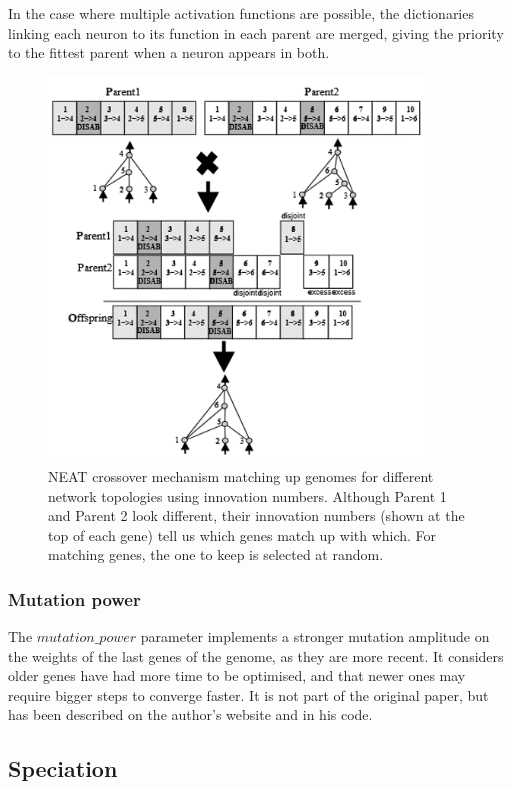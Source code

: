In the case where multiple activation functions are possible, the dictionaries linking each neuron to its function in each parent are merged, giving the priority to the fittest parent when a neuron appears in both. 

\begin{figure}[H]
\centering
\captionsetup{justification=centering,margin=2cm}
\includegraphics[width=10cm]{images/neat_cros.png}
\caption{NEAT crossover mechanism matching  up  genomes  for  different  network  topologies  using  innovation numbers.   Although  Parent 1  and  Parent 2  look  different,  their  innovation  numbers (shown at the top of each gene) tell us which genes match up with which. For matching genes, the one to keep is selected at random. \cite{NEAT_2}}
 \label{NEAT_network}
\end{figure}

\subsubsection{Mutation power}

The $mutation\_power$ parameter implements a stronger mutation amplitude on the weights of the last genes of the genome, as they are more recent. It considers older genes have had more time to be optimised, and that newer ones may require bigger steps to converge faster. It is not part of the original paper, but has been described on the author's website and in his code.

\subsection{Speciation}

